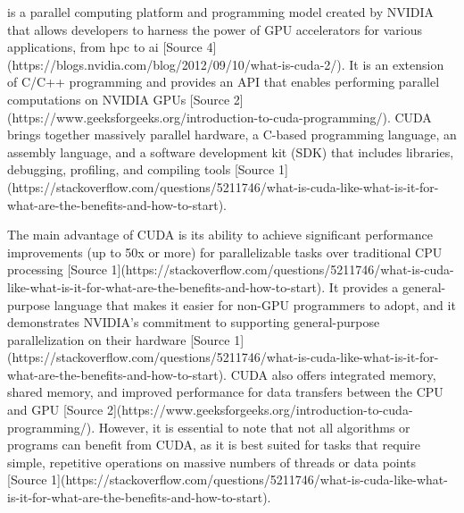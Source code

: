 

\cuda is a parallel computing platform and programming model created by NVIDIA that allows developers to harness the power of GPU accelerators for various applications, from \gls{hpc} to \gls{ai} [Source 4](https://blogs.nvidia.com/blog/2012/09/10/what-is-cuda-2/).
It is an extension of C/C++ programming and provides an API that enables performing parallel computations on NVIDIA GPUs [Source 2](https://www.geeksforgeeks.org/introduction-to-cuda-programming/).
CUDA brings together massively parallel hardware, a C-based programming language, an assembly language, and a software development kit (SDK) that includes libraries, debugging, profiling, and compiling tools [Source 1](https://stackoverflow.com/questions/5211746/what-is-cuda-like-what-is-it-for-what-are-the-benefits-and-how-to-start).

The main advantage of CUDA is its ability to achieve significant performance improvements (up to 50x or more) for parallelizable tasks over traditional CPU processing [Source 1](https://stackoverflow.com/questions/5211746/what-is-cuda-like-what-is-it-for-what-are-the-benefits-and-how-to-start).
It provides a general-purpose language that makes it easier for non-GPU programmers to adopt, and it demonstrates NVIDIA's commitment to supporting general-purpose parallelization on their hardware [Source 1](https://stackoverflow.com/questions/5211746/what-is-cuda-like-what-is-it-for-what-are-the-benefits-and-how-to-start).
CUDA also offers integrated memory, shared memory, and improved performance for data transfers between the CPU and GPU [Source 2](https://www.geeksforgeeks.org/introduction-to-cuda-programming/).
However, it is essential to note that not all algorithms or programs can benefit from CUDA, as it is best suited for tasks that require simple, repetitive operations on massive numbers of threads or data points [Source 1](https://stackoverflow.com/questions/5211746/what-is-cuda-like-what-is-it-for-what-are-the-benefits-and-how-to-start).